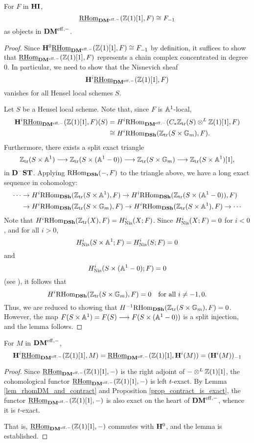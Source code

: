 \begin{lem}\label{lem_rhomDM_and_contract}
For $F$ in $\HI$,
\[
\ihomDMf(\Z(1)[1], F) \cong \RHI{F}
\]
as objects in $\DMeff$.
\end{lem}
\begin{proof}
Since $\HH^0 \ihomDMf(\Z(1)[1], F) \cong \RHI{F}$ by definition, 
it suffices to show that $\ihomDMf(\Z(1)[1], F)$ represents a 
chain complex concentrated in degree 0. In particular, we need
to show that the Nisnevich sheaf
\[
\HH^i\ihomDMf(\Z(1)[1], F)
\]
vanishes for all Hensel local schemes $S$.

Let $S$ be a Hensel local scheme. Note that, since $F$ is 
$\A^1$-local,
\begin{align*}
\HH^i\ihomDMf(\Z(1)[1], F)(S) &= H^i\rhomDMf(\CZtr(S) 
   \tDM \Z(1)[1], F) \\
   &\cong H^i\homDSh(\Ztr(S \times 
   \Gm), F).
\end{align*}
Furthermore, there exists a split exact triangle
\[
\Ztr(S \times \A^1) \to \Ztr(S \times (\A^1 - 0)) \to 
   \Ztr(S \times \Gm) \to \Ztr(S \times \A^1)[1],
\]
in $\DShCor$. Applying $\homDSh(-, F)$ to the triangle above, we 
have a long exact sequence in cohomology:
\begin{align*}
\cdots & \rightarrow H^i\homDSh(\Ztr(S \times \A^1), F) 
   \rightarrow H^i\homDSh(\Ztr(S \times (\A^1 - 0)), F) \\
 & \rightarrow H^i\homDSh(\Ztr(S \times \Gm), F) \rightarrow 
   H^i\homDSh(\Ztr(S \times \A^1), F) \rightarrow \cdots
\end{align*}
Note that $H^i\homDSh(\Ztr(X), F) = H_{\Nis}^i(X; F)$. Since
$H^i_{\Nis}(X; F) = 0$ for $i < 0$, and for all $i > 0$, 
\[
H_{\Nis}^i(S \times \A^1; F) = H_{\Nis}^i(S; F) = 0
\] 
and 
\[
H_{\Nis}^i(S \times (\A^1 - 0); F) = 0
\] 
(see \cite[24.5]{MVW}), it follows that 
\[
H^i\homDSh(\Ztr(S \times \Gm), F) = 0 \quad\textrm{for all $i \neq -1, 0$.}
\] 
Thus, we are reduced to showing that $H^{-1}\homDSh(\Ztr(S \times 
\Gm), F) = 0$. However, the map $F(S \times \A^1) = F(S) \to F(S 
\times (\A^1 - 0))$ is a split injection, and the lemma follows.
\end{proof}

\begin{lem}\label{lem_H_com_ihom_DM}
For $M$ in $\DMeff$, 
\[
\HH^i\ihomDMf(\Z(1)[1], M) = \ihomDMf(\Z(1)[1], \HH^i(M)) = 
   \RHI{(\HH^i(M))}
\]
\end{lem}
\begin{proof}
Since $\ihomDMf(\Z(1)[1], -)$ is the right adjoint of $-\tDM 
\Z(1)[1]$, the cohomological functor $\ihomDMf(\Z(1)[1], -)$ is 
left $t$-exact. By Lemma \ref{lem_rhomDM_and_contract} and 
Proposition \ref{prop_contract_is_exact}, the functor 
$\ihomDMf(\Z(1)[1], -)$ is also exact on the heart of $\DMeff$, 
whence it is $t$-exact.

That is, $\ihomDMf(\Z(1)[1], -)$ commutes with $\HH^0$,
and the lemma is established.
\end{proof}

